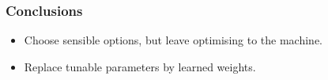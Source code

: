 \documentclass{beamer}
\begin{document}
\begin{frame}[fragile]

\begin{overprint}%
\centering%
%
%
\par%
\end{overprint}

\end{frame}



\begin{frame}[fragile]
\frametitle{Conclusions}

\begin{itemize}
\item Choose sensible options, but leave optimising to the machine.
\item Replace tunable parameters by learned weights.
\end{itemize}

\end{frame}
\end{document}
